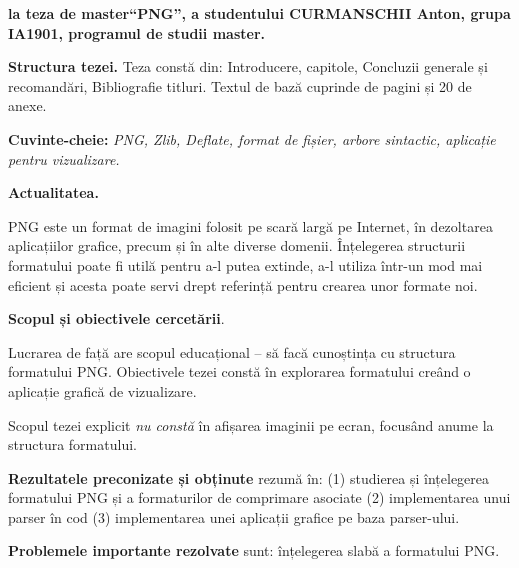 \documentclass[a4paper,12pt]{report}
\newcommand{\authorName}{CURMANSCHII Anton}
\newcommand{\thesisTitle}{PNG}
\newcommand{\uniGroupName}{IA1901}
\newcommand{\thesisType}{master}
\newcommand{\programulDeStudii}{master}
\newcommand{\anexeCount}{20}
\begin{document}


\clearpage
\tableofcontents

\clearpage
{}
\begin{acronym}
\end{acronym}


\clearpage
{}

\textbf{la teza de \thesisType ``\thesisTitle'', a studentului \authorName{}, grupa \uniGroupName{}, programul de studii \programulDeStudii.}

\textbf{Structura tezei.}
Teza constă din: Introducere,  capitole, Concluzii generale și recomandări, Bibliografie \bibliographyEntryCount{} titluri.
Textul de bază cuprinde \usefulPageCount{} de pagini și \anexeCount{} de anexe.

\textbf{Cuvinte-cheie:}
\textit{\ac{PNG}, \ac{Zlib}, \ac{Deflate}, format de fișier, arbore sintactic, aplicație pentru vizualizare.}

\textbf{Actualitatea.}

\ac{PNG} este un format de imagini folosit pe scară largă pe Internet,
în dezoltarea aplicațiilor grafice, precum și în alte diverse domenii.
Înțelegerea structurii formatului poate fi utilă pentru a-l putea extinde, 
a-l utiliza într-un mod mai eficient și acesta poate servi drept referință pentru 
crearea unor formate noi.

\textbf{Scopul și obiectivele cercetării}.

Lucrarea de față are scopul educațional -- să facă cunoștința cu structura formatului \ac{PNG}.
Obiectivele tezei constă în explorarea formatului creând o aplicație grafică de vizualizare.

Scopul tezei explicit \textit{nu constă} în afișarea imaginii pe ecran, focusând anume la structura formatului.

\textbf{Rezultatele preconizate și obținute} rezumă în: 
(1) studierea și înțelegerea formatului \ac{PNG} și a formaturilor de comprimare asociate 
(2) implementarea unui parser în cod
(3) implementarea unei aplicații grafice pe baza parser-ului.

\textbf{Problemele importante rezolvate} sunt: înțelegerea slabă a formatului \ac{PNG}.
\end{document}
